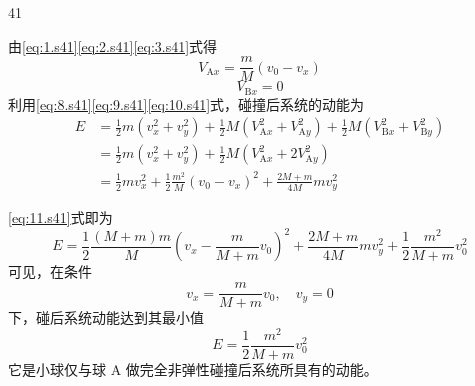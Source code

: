 \begin{solution}{41}
\begin{subsolution}
        由\eqref{eq:1.s41}\eqref{eq:2.s41}\eqref{eq:3.s41}式得
        \begin{equation}
            V_{\mathrm{A}x} = \frac{m}{M}(v_{0} - v_{x})
            \label{eq:9.s41}
        \end{equation}
        \begin{equation}
            V_{\mathrm{B}x} = 0
            \label{eq:10.s41}
        \end{equation}
        利用\eqref{eq:8.s41}\eqref{eq:9.s41}\eqref{eq:10.s41}式，碰撞后系统的动能为
        \begin{equation}
            \begin{aligned}
                E &= \frac{1}{2} m(v_{x}^{2} + v_{y}^{2}) + \frac{1}{2} M(V_{\mathrm{A}x}^{2} + V_{\mathrm{A}y}^{2}) + \frac{1}{2} M(V_{\mathrm{B}x}^{2} + V_{\mathrm{B}y}^{2}) \\
                &= \frac{1}{2} m(v_{x}^{2} + v_{y}^{2}) + \frac{1}{2} M(V_{\mathrm{A}x}^{2} + 2V_{\mathrm{A}y}^{2}) \\
                &= \frac{1}{2} m v_{x}^{2} + \frac{1}{2} \frac{m^{2}}{M}(v_{0} - v_{x})^{2} + \frac{2M + m}{4M} m v_{y}^{2}
            \end{aligned}
            \label{eq:11.s41}
        \end{equation}
    \end{subsolution}
    \begin{subsolution}
        \eqref{eq:11.s41}式即为
        \begin{equation}
            E = \frac{1}{2} \frac{(M + m)m}{M} \left(v_{x} - \frac{m}{M + m} v_{0}\right)^{2} + \frac{2M + m}{4M} m v_{y}^{2} + \frac{1}{2} \frac{m^{2}}{M + m} v_{0}^{2}
            \label{eq:12.s41}
        \end{equation}
        可见，在条件
        \begin{equation}
            v_{x} = \frac{m}{M + m} v_{0},\quad v_{y} = 0
            \label{eq:13.s41}
        \end{equation}
        下，碰后系统动能达到其最小值
        \begin{equation}
            E = \frac{1}{2} \frac{m^{2}}{M + m} v_{0}^{2}
            \label{eq:14.s41}
        \end{equation}
        它是小球仅与球 A 做完全非弹性碰撞后系统所具有的动能。
    \end{subsolution}
\end{solution}